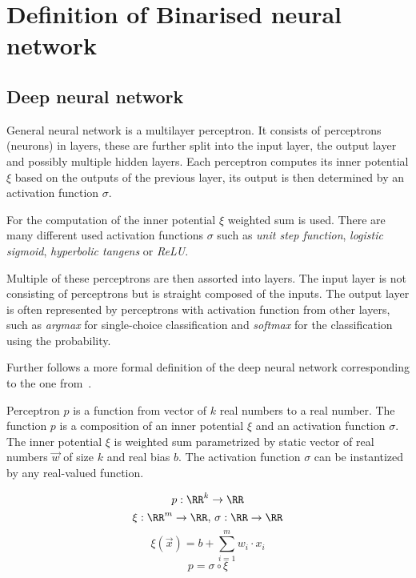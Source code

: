 \section{Definition of Binarised neural network}

\subsection{Deep neural network}


General neural network is a multilayer perceptron. It consists of perceptrons (neurons) in layers,
these are further split into the input layer, the output layer and possibly multiple
hidden layers. Each perceptron computes its inner potential $\xi$ based on the outputs of
the previous layer, its output is then determined by an activation function $\sigma$.

For the computation of the inner potential $\xi$ weighted sum is used.
There are many different used activation functions $\sigma$ such as
\textit{unit step function}, \textit{logistic sigmoid},
\textit{hyperbolic tangens} or \textit{ReLU}.

Multiple of these perceptrons are then assorted into layers. The input layer is not
consisting of perceptrons but is straight composed of the inputs. The output layer is
often represented by perceptrons with activation function from other layers, such as
\textit{argmax} for single-choice classification and
\textit{softmax} for the classification using the probability.

Further follows a more formal definition of the deep neural network
corresponding to the one from~\cite{Bishop1995NeuralNF}.

\sectionsep{}

\begin{definition}[Perceptron]
Perceptron $p$ is a function from vector of $k$ real numbers to a real number.
The function $p$ is a composition of an inner potential $\xi$
and an activation function $\sigma$. The inner potential $\xi$ is weighted sum
parametrized by static vector of real numbers
$\vec w$ of size $k$ and real bias $b$.
The activation function $\sigma$ can be instantized by any real-valued function.

\begin{equation*}
	p: \RR^k \to \RR
\end{equation*}
\begin{equation*}
	\xi: \RR^m \to \RR, \,
	\sigma: \RR \to \RR
\end{equation*}
\begin{equation*}
	\xi(\vec x) = b + \sum_{i=1}^m w_i\cdot x_i
\end{equation*}
\begin{equation*}
	p = \sigma \circ \xi
\end{equation*}
\end{definition}

